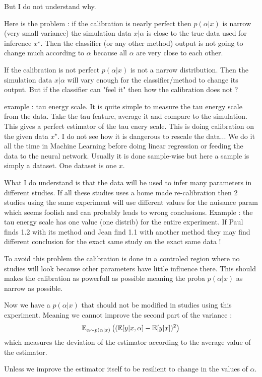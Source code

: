 But I do not understand why.

Here is the problem : if the calibration is nearly perfect then $p(\alpha|x)$ is narrow (\ie very small variance) the simulation data $x|\alpha$ is close to the true data used for inference $x^\star$. Then the classifier (or any other method) output is not going to change much according to $\alpha$ because all $\alpha$ are very close to each other.

If the calibration is not perfect $p(\alpha|x)$ is not a narrow distribution. Then the simulation data $x|\alpha$ will vary enough for the classifier/method to change its output. But if the classifier can "feel it" then how the calibration does not ?


example : tau energy scale.
It is quite simple to measure the tau energy scale from the data. Take the tau feature, average it and compare to the simulation. This gives a perfect estimator of the tau enery scale. This is doing calibration on the given data $x^\star$.
I do not see how it is dangerous to rescale the data... We do it all the time in Machine Learning before doing linear regression or feeding the data to the neural network. Usually it is done sample-wise but here a sample is simply a dataset. One dataset is one $x$.


What I do understand is that the data will be used to infer many parameters in different studies. 
If all these studies uses a home made re-calibration then 2 studies using the same experiment will use different values for the nuisance param which seems foolish and can probably leads to wrong conclusions.
Example : the tau energy scale has one value (one distrib) for the entire experiment. If Paul finds 1.2 with its method and Jean find 1.1 with another method they may find different conclusion for the exact same study on the exact same data !

To avoid this problem the calibration is done in a controled region where no studies will look because other parameters have little influence there.
This should makes the calibration as powerfull as possible meaning the proba $p(\alpha|x)$ as narrow as possible.

Now we have a $p(\alpha|x)$ that should not be modified in studies using this experiment.
Meaning we cannot improve the second part of the variance : 
$$\mathbb{E}_{\alpha \sim p(\alpha|x)} \left ((\mathbb{E} [y|x, \alpha]  - \mathbb{E}[y|x])^2\right )$$
which measures the deviation of the estimator according to the average value of the estimator.


Unless we improve the estimator itself to be resilient to change in the values of $\alpha$.


